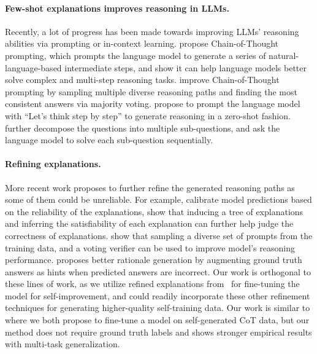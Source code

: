 \documentclass{article} %
\begin{document}
\paragraph{Few-shot explanations improves reasoning in LLMs.}
Recently, a lot of progress has been made towards improving LLMs' reasoning abilities via prompting or in-context learning.
\citet{Wei2022ChainOT} propose Chain-of-Thought prompting, which prompts the language model to generate a series of natural-language-based intermediate steps, and show it can help language models better solve complex and multi-step reasoning tasks.
\citet{Wang2022SelfConsistencyIC} improve Chain-of-Thought prompting by sampling multiple diverse reasoning paths and finding the most consistent answers via majority voting.
\citet{step_by_step} propose to prompt the language model with ``Let's think step by step'' to generate reasoning in a zero-shot fashion.
\citet{Zhou2022LeasttoMostPE} further decompose the questions into multiple sub-questions, and ask the language model to solve each sub-question sequentially.

\paragraph{Refining explanations.}
More recent work proposes to further refine the generated reasoning paths as some of them could be unreliable. For example, \citet{ye2022unreliability} calibrate model predictions based on the reliability of the explanations, \citet{maieutic_prompting} show that inducing a tree of explanations and inferring the satisfiability of each explanation can further help judge the correctness of explanations.
\citet{better_reasoner} show that sampling a diverse set of prompts from the training data, and a voting verifier can be used to improve model's reasoning performance.
\citet{star} proposes better rationale generation by augmenting ground truth answers as hints when predicted answers are incorrect. %
Our work is orthogonal to these lines of work, as we utilize refined explanations from~\citet{Wang2022SelfConsistencyIC} for fine-tuning the model for self-improvement, and could readily incorporate these other refinement techniques for generating higher-quality self-training data. Our work is similar to \citet{star} where we both propose to fine-tune a model on self-generated CoT data, but our method does not require ground truth labels and shows stronger empirical results with multi-task generalization.
\end{document}
